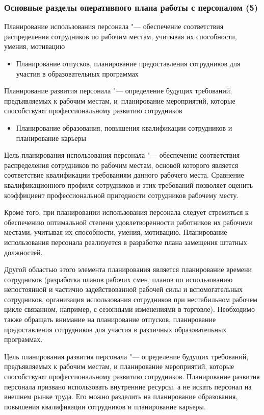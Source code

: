 \documentclass{../industrial-development}
\begin{document}
\begin{frame} \frametitle{Основные разделы оперативного плана работы с персоналом (5)}
	\alert{Планирование использования персонала} "--- обеспечение соответствия распределения сотрудников по рабочим местам, учитывая их способности, умения, мотивацию
	\begin{itemize}
		\item {\small Планирование отпусков, планирование предоставления сотрудников для участия в образовательных программах}
	\end{itemize}	
	\alert{Планирование развития персонала} "--- определение будущих требований, предъявляемых к рабочим местам, и~планирование мероприятий, которые способствуют профессиональному развитию сотрудников
	\begin{itemize}
		\item {\small Планирование образования, повышения квалификации сотрудников и планирование карьеры}
	\end{itemize}
\end{frame}
\lecturenotes

\alert{Цель планирования использования персонала} "--- обеспечение соответствия распределения сотрудников по рабочим местам, основой которого является соответствие квалификации требованиям данного рабочего места. Сравнение квалификационного профиля сотрудников и этих требований позволяет оценить коэффициент профессиональной пригодности сотрудников рабочему месту.

Кроме того, при планировании использования персонала следует стремиться к обеспечению оптимальной степени удовлетворенности работников их рабочими местами, учитывая их способности, умения, мотивацию. Планирование использования персонала реализуется в разработке плана замещения штатных должностей.

Другой областью этого элемента планирования является планирование времени сотрудников (разработка планов рабочих смен, планов по использованию непостоянной и частично задействованной рабочей силы и вспомогательных сотрудников, организация использования сотрудников при нестабильном рабочем цикле связанном, например, с сезонными изменениями в торговле). Необходимо также обращать внимание на планирование отпусков, планирование предоставления сотрудников для участия в различных образовательных программах.

\alert{Цель планирования развития персонала} "---  определение будущих требований, предъявляемых к рабочим местам, и планирование мероприятий, которые способствуют профессиональному развитию сотрудников. Планирование развития персонала призвано использовать внутренние ресурсы, а не искать персонал на внешнем рынке труда. Его можно разделить на планирование образования, повышения квалификации сотрудников и планирование карьеры.
\end{document}
